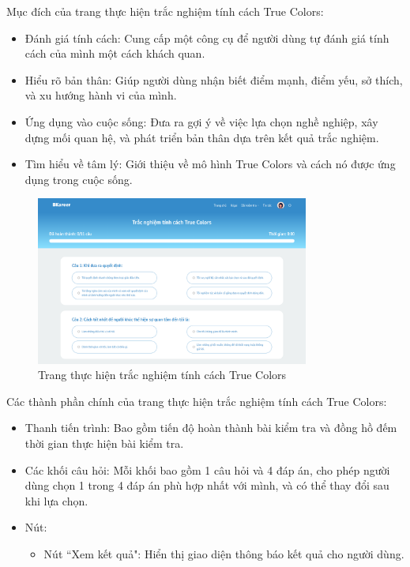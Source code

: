 Mục đích của trang thực hiện trắc nghiệm tính cách True Colors:
\begin{itemize}
    \item Đánh giá tính cách: Cung cấp một công cụ để người dùng tự đánh giá tính cách của mình một cách khách quan.
    \item Hiểu rõ bản thân: Giúp người dùng nhận biết điểm mạnh, điểm yếu, sở thích, và xu hướng hành vi của mình.
    \item Ứng dụng vào cuộc sống: Đưa ra gợi ý về việc lựa chọn nghề nghiệp, xây dựng mối quan hệ, và phát triển bản thân dựa trên kết quả trắc nghiệm.
    \item Tìm hiểu về tâm lý: Giới thiệu về mô hình True Colors và cách nó được ứng dụng trong cuộc sống.
\end{itemize}

\begin{figure}[H]
    \centering
    \includegraphics[width=0.8\textwidth]
    {images/chap5/trueColors.png}
    \vspace{0.5cm}
    \caption{Trang thực hiện trắc nghiệm tính cách True Colors}
\end{figure}

Các thành phần chính của trang thực hiện trắc nghiệm tính cách True Colors:
\begin{itemize}
    \item Thanh tiến trình: Bao gồm tiến độ hoàn thành bài kiểm tra và đồng hồ đếm thời gian thực hiện bài kiểm tra.
    \item Các khối câu hỏi: Mỗi khối bao gồm 1 câu hỏi và 4 đáp án, cho phép người dùng chọn 1 trong 4 đáp án phù hợp nhất với mình, và có thể thay đổi sau khi lựa chọn.
    \item Nút:
        \begin{itemize}
            \item Nút ``Xem kết quả": Hiển thị giao diện thông báo kết quả cho người dùng.
        \end{itemize}
\end{itemize}


